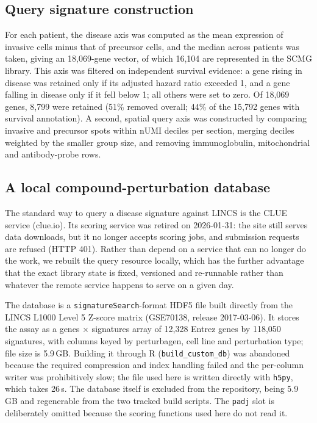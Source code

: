 \subsection{Query signature construction}

For each patient, the disease axis was computed as the mean expression of invasive cells
minus that of precursor cells, and the median across patients was taken, giving an
18,069-gene vector, of which 16,104 are represented in the SCMG library. This axis was
filtered on independent survival evidence: a gene rising
in disease was retained only if its adjusted hazard ratio exceeded 1, and a gene falling in
disease only if it fell below 1; all others were set to zero. Of 18,069 genes, 8,799 were
retained (51\% removed overall; 44\% of the 15,792 genes with survival annotation).
A second, spatial query axis was constructed by comparing invasive and precursor spots
within nUMI deciles per section, merging deciles weighted by the smaller group size, and
removing immunoglobulin, mitochondrial and antibody-probe rows.

\subsection{A local compound-perturbation database}

The standard way to query a disease signature against LINCS is the CLUE service
(clue.io). Its scoring service was retired on 2026-01-31: the site still serves data
downloads, but it no longer accepts scoring jobs, and submission requests are refused
(HTTP 401). Rather than depend on a service that can no longer do the work, we rebuilt the
query resource locally, which has the further advantage that the exact library state is
fixed, versioned and re-runnable rather than whatever the remote service happens to serve
on a given day.

The database is a \texttt{signatureSearch}-format HDF5 file built directly from the LINCS
L1000 Level 5 Z-score matrix (GSE70138, release 2017-03-06). It stores the assay as a
genes $\times$ signatures array of 12{,}328 Entrez genes by 118{,}050 signatures, with
columns keyed by perturbagen, cell line and perturbation type; file size is 5.9\,GB.
Building it through R (\texttt{build\_custom\_db}) was abandoned because the required
compression and index handling failed and the per-column writer was prohibitively slow; the
file used here is written directly with \texttt{h5py}, which takes 26\,s. The database
itself is excluded from the repository, being 5.9\,GB and regenerable from the two tracked
build scripts. The \texttt{padj} slot is deliberately omitted because the scoring functions
used here do not read it.

